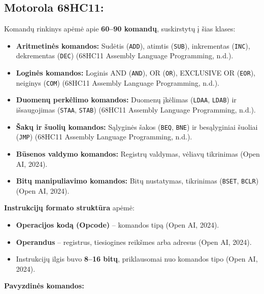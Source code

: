 \documentclass[a4paper,12pt]{article}
\begin{document}
\subsection{Motorola 68HC11:}
Komandų rinkinys apėmė apie \textbf{60–90 komandų}, suskirstytų į šias klases:
\begin{itemize}
    \item \textbf{Aritmetinės komandos:} Sudėtis (\texttt{ADD}), atimtis (\texttt{SUB}), inkrementas (\texttt{INC}), dekrementas (\texttt{DEC}) (68HC11 Assembly Language Programming, n.d.).
    \item \textbf{Loginės komandos:} Loginis AND (\texttt{AND}), OR (\texttt{OR}), EXCLUSIVE OR (\texttt{EOR}), neiginys (\texttt{COM}) (68HC11 Assembly Language Programming, n.d.).
    \item \textbf{Duomenų perkėlimo komandos:} Duomenų įkėlimas (\texttt{LDAA}, \texttt{LDAB}) ir išsaugojimas (\texttt{STAA}, \texttt{STAB}) (68HC11 Assembly Language Programming, n.d.).
    \item \textbf{Šakų ir šuolių komandos:} Sąlyginės šakos (\texttt{BEQ}, \texttt{BNE}) ir besąlyginiai šuoliai (\texttt{JMP}) (68HC11 Assembly Language Programming, n.d.).
    \item \textbf{Būsenos valdymo komandos:} Registrų valdymas, vėliavų tikrinimas (Open AI, 2024).
    \item \textbf{Bitų manipuliavimo komandos:} Bitų nustatymas, tikrinimas (\texttt{BSET}, \texttt{BCLR}) (Open AI, 2024).
\end{itemize}
\textbf{Instrukcijų formato struktūra} apėmė:
\begin{itemize}
    \item \textbf{Operacijos kodą (Opcode)} – komandos tipą (Open AI, 2024).
    \item \textbf{Operandus} – registrus, tiesiogines reikšmes arba adresus (Open AI, 2024).
    \item Instrukcijų ilgis buvo \textbf{8–16 bitų}, priklausomai nuo komandos tipo (Open AI, 2024).
\end{itemize}
\textbf{Pavyzdinės komandos:}
\end{document}
